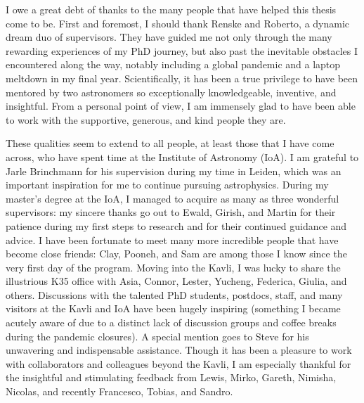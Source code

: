 
\begin{acknowledgements}      
    
    I owe a great debt of thanks to the many people that have helped this thesis come to be. First and foremost, I should thank Renske and Roberto, a dynamic dream duo of supervisors. They have guided me not only through the many rewarding experiences of my PhD journey, but also past the inevitable obstacles I encountered along the way, notably including a global pandemic and a laptop meltdown in my final year. Scientifically, it has been a true privilege to have been mentored by two astronomers so exceptionally knowledgeable, inventive, and insightful. From a personal point of view, I am immensely glad to have been able to work with the supportive, generous, and kind people they are.
    
    These qualities seem to extend to all people, at least those that I have come across, who have spent time at the Institute of Astronomy (IoA). I am grateful to Jarle Brinchmann for his supervision during my time in Leiden, which was an important inspiration for me to continue pursuing astrophysics. During my master's degree at the IoA, I managed to acquire as many as three wonderful supervisors: my sincere thanks go out to Ewald, Girish, and Martin for their patience during my first steps to research and for their continued guidance and advice. I have been fortunate to meet many more incredible people that have become close friends: Clay, Pooneh, and Sam are among those I know since the very first day of the program. Moving into the Kavli, I was lucky to share the illustrious K35 office with Asia, Connor, Lester, Yucheng, Federica, Giulia, and others. Discussions with the talented PhD students, postdocs, staff, and many visitors at the Kavli and IoA have been hugely inspiring (something I became acutely aware of due to a distinct lack of discussion groups and coffee breaks during the pandemic closures). A special mention goes to Steve for his unwavering and indispensable assistance. Though it has been a pleasure to work with collaborators and colleagues beyond the Kavli, I am especially thankful for the insightful and stimulating feedback from Lewis, Mirko, Gareth, Nimisha, Nicolas, and recently Francesco, Tobias, and Sandro.
    

\end{acknowledgements}
